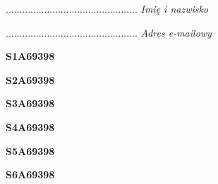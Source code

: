 \begin{turn}{90}\begin{minipage}{\linewidth} \vspace{20mm} ................................................  \textit{Imię i nazwisko}\end{minipage}\end{turn}

\begin{turn}{90}\begin{minipage}{\linewidth} \vspace{20mm} ................................................  \textit{Adres e-mailowy}\end{minipage}\end{turn}

\begin{turn}{90}\huge \begin{minipage}{\linewidth} \vspace{10mm}\textbf{S1A69398}\end{minipage}\end{turn}

\begin{turn}{90}\huge \begin{minipage}{\linewidth} \vspace{10mm}\textbf{S2A69398}\end{minipage}\end{turn}

\begin{turn}{90}\huge \begin{minipage}{\linewidth} \vspace{10mm}\textbf{S3A69398}\end{minipage}\end{turn}

\begin{turn}{90}\huge \begin{minipage}{\linewidth} \vspace{10mm}\textbf{S4A69398}\end{minipage}\end{turn}

\begin{turn}{90}\huge \begin{minipage}{\linewidth} \vspace{10mm}\textbf{S5A69398}\end{minipage}\end{turn}

\begin{turn}{90}\huge \begin{minipage}{\linewidth} \vspace{10mm}\textbf{S6A69398}\end{minipage}\end{turn}

